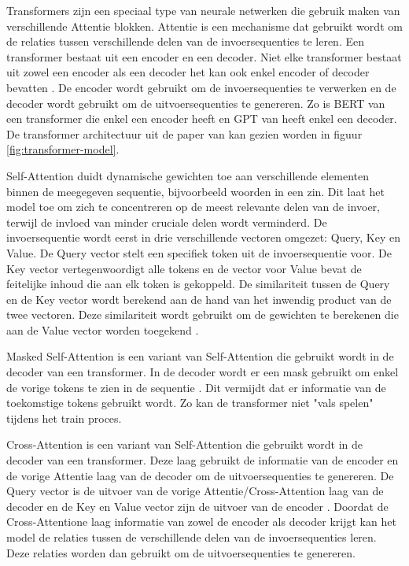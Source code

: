 Transformers zijn een speciaal type van neurale netwerken die gebruik maken van verschillende Attentie blokken.
Attentie is een mechanisme dat gebruikt wordt om de relaties tussen verschillende delen van de invoersequenties te leren.
Een transformer bestaat uit een encoder en een decoder. 
Niet elke transformer bestaat uit zowel een encoder als een decoder het kan ook enkel encoder of decoder bevatten \autocite{Hoque2023}.
De encoder wordt gebruikt om de invoersequenties te verwerken en de decoder wordt gebruikt om de uitvoersequenties te genereren.
Zo is BERT van \textcite{DevlinEtAl2019} een transformer die enkel een encoder heeft en GPT van \textcite{RandfordEtAL2018} heeft enkel een decoder.
De transformer architectuur uit de paper van \textcite{VaswaniEtAl2017} kan gezien worden in figuur \ref{fig:transformer-model}. 

Self-Attention duidt dynamische gewichten toe aan verschillende elementen binnen de meegegeven sequentie, bijvoorbeeld woorden in een zin.
Dit laat het model toe om zich te concentreren op de meest relevante delen van de invoer, terwijl de invloed van minder cruciale delen wordt verminderd.
De invoersequentie wordt eerst in drie verschillende vectoren omgezet: Query, Key en Value.
De Query vector stelt een specifiek token uit de invoersequentie voor. De Key vector vertegenwoordigt alle tokens en de vector voor Value bevat de feitelijke inhoud die aan elk token is gekoppeld.
De similariteit tussen de Query en de Key vector wordt berekend aan de hand van het inwendig product van de twee vectoren.
Deze similariteit wordt gebruikt om de gewichten te berekenen die aan de Value vector worden toegekend \autocite{VaswaniEtAl2017}.

Masked Self-Attention is een variant van Self-Attention die gebruikt wordt in de decoder van een transformer.
In de decoder wordt er een mask gebruikt om enkel de vorige tokens te zien in de sequentie \autocite{VaswaniEtAl2017}.
Dit vermijdt dat er informatie van de toekomstige tokens gebruikt wordt. 
Zo kan de transformer niet "vals spelen" tijdens het train proces.

Cross-Attention is een variant van Self-Attention die gebruikt wordt in de decoder van een transformer.
Deze laag gebruikt de informatie van de encoder en de vorige Attentie laag van de decoder om de uitvoersequenties te genereren.
De Query vector is de uitvoer van de vorige Attentie/Cross-Attention laag van de decoder en de Key en Value vector zijn de uitvoer van de encoder \autocite{VaswaniEtAl2017}.
Doordat de Cross-Attentione laag informatie van zowel de encoder als decoder krijgt kan het model de relaties tussen de verschillende delen van de invoersequenties leren.
Deze relaties worden dan gebruikt om de uitvoersequenties te genereren.

